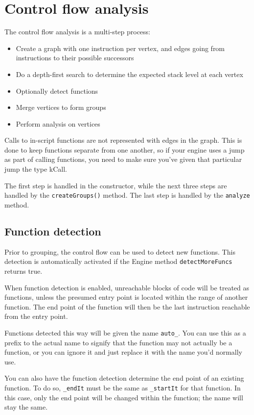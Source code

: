 \section{Control flow analysis}

The control flow analysis is a multi-step process:

\begin{itemize}
\item Create a graph with one instruction per vertex, and edges going from instructions to their possible successors
\item Do a depth-first search to determine the expected stack level at each vertex
\item Optionally detect functions
\item Merge vertices to form groups
\item Perform analysis on vertices
\end{itemize}

Calls to in-script functions are not represented with edges in the graph. This is done to keep functions separate from one another, so if your engine uses a jump as part of calling functions, you need to make sure you've given that particular jump the type kCall.

The first step is handled in the constructor, while the next three steps are handled by the \verb+createGroups()+ method. The last step is handled by the \verb+analyze+ method.

\subsection{Function detection}
\label{sec:autofunc}
Prior to grouping, the control flow can be used to detect new functions. This detection is automatically activated if the Engine method \verb+detectMoreFuncs+ returns true.

When function detection is enabled, unreachable blocks of code will be treated as functions, unless the presumed entry point is located within the range of another function. The end point of the function will then be the last instruction reachable from the entry point.

Functions detected this way will be given the name \verb+auto_+. You can use this as a prefix to the actual name to signify that the function may not actually be a function, or you can ignore it and just replace it with the name you'd normally use.

You can also have the function detection determine the end point of an existing function. To do so, \verb+_endIt+ must be the same as \verb+_startIt+ for that function. In this case, only the end point will be changed within the function; the name will stay the same.


